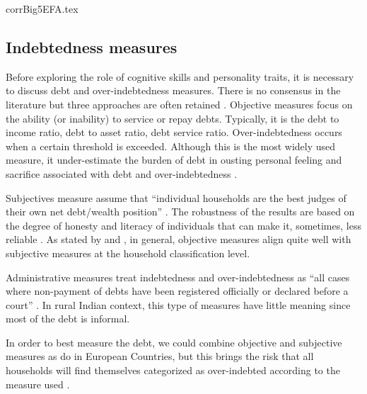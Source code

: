 \documentclass[a4paper, 11pt, onecolumn]{article}
\begin{document}


{corrBig5EFA.tex}



	\subsection{Indebtedness measures}

Before exploring the role of cognitive skills and personality traits, it is necessary to discuss debt and over-indebtedness measures.
There is no consensus in the literature but three approaches are often retained \citep{Betti2007, Ferreira2000}.
Objective measures focus on the ability (or inability) to service or repay debts.
Typically, it is the debt to income ratio, debt to asset ratio, debt service ratio.
Over-indebtedness occurs when a certain threshold is exceeded.
Although this is the most widely used measure, it under-estimate the burden of debt in ousting personal feeling and sacrifice associated with debt and over-indebtedness \citep{Betti2007}.
 
Subjectives measure assume that ``individual households are the best judges of their own net debt/wealth position'' \citep{Betti2007}.
The robustness of the results are based on the degree of honesty and literacy of individuals that can make it, sometimes, less reliable \citep{Betti2007, DAlessio2013}.
As stated by \cite{Rinaldi2006} and \cite{Keese2012}, in general, objective measures align quite well with subjective measures at the household classification level.

Administrative measures treat indebtedness and over-indebtedness as ``all cases
where non-payment of debts have been registered officially or declared before a court'' \citep{Betti2007}.
In rural Indian context, this type of measures have little meaning since most of the debt is informal.

In order to best measure the debt, we could combine objective and subjective measures as \cite{Aniola2012} do in European Countries, but this brings the risk that all households will find themselves categorized as over-indebted according to the measure used \citep{Chichaibelu2018}.
\end{document}
